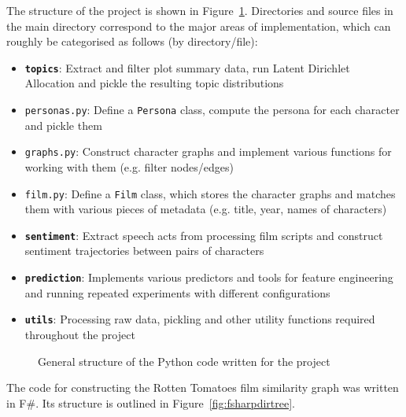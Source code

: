 \documentclass[bsc,frontabs,singlespacing,parskip]{infthesis} %
\begin{document}
The structure of the project is shown in Figure~\ref{fig:dirtree}. Directories and source files in the main directory correspond to the major areas of implementation, which can roughly be categorised as follows (by directory/file):
\begin{itemize}
	\item \texttt{\textbf{topics}}:  Extract and filter plot summary data, run Latent Dirichlet Allocation and pickle the resulting topic distributions
	\item \texttt{personas.py}: Define a \texttt{Persona} class, compute the persona for each character and pickle them
	\item \texttt{graphs.py}: Construct character graphs and implement various functions for working with them (e.g. filter nodes/edges)
	\item \texttt{film.py}: Define a \texttt{Film} class, which stores the character graphs and matches them with various pieces of metadata (e.g. title, year, names of characters)
	\item \texttt{\textbf{sentiment}}: Extract speech acts from processing film scripts and construct sentiment trajectories between pairs of characters
	\item \texttt{\textbf{prediction}}: Implements various predictors and tools for feature engineering and running repeated experiments with different configurations
	\item \texttt{\textbf{utils}}: Processing raw data, pickling and other utility functions required throughout the project
\end{itemize}

\hspace{.1in}
\begin{figure}[ht!]
\caption{General structure of the Python code written for the project}
\label{fig:dirtree}
\end{figure}

The code for constructing the Rotten Tomatoes film similarity graph was written in F\#. Its structure is outlined in Figure~\ref{fig:fsharpdirtree}.
\end{document}
